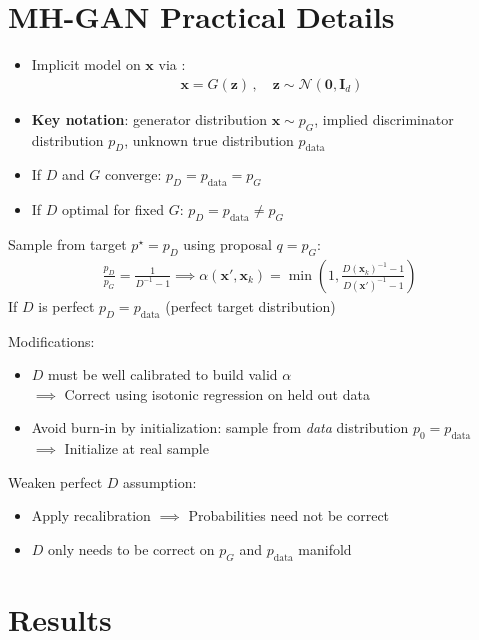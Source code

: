 \documentclass[a0,landscape]{a0poster}
\newcommand{\mysection}[1]{\section*{\fontsize{67.1}{82} \selectfont \color{NavyBlue} #1 \color{Black}}}
\renewcommand{\vec}[1]{{\boldsymbol{\mathbf{#1}}}} %
\newcommand{\R}{\mathbb{R}}
\newcommand{\set}[1]{\mathcal{#1}}
\newcommand{\sample}{\sim}
\newcommand{\norm}{\mathcal{N}}
\newcommand{\target}{{p^\star}}
\newcommand{\prop}{q}
\newcommand{\PG}{{p_G}}
\newcommand{\PD}{{p_D}}
\newcommand{\PR}{{p_{\textrm{data}}}}
\newcommand{\accept}{\alpha}
\newcommand{\setx}{\set{X}}
\begin{document}
\begin{multicols}{3}
\mysection{MH-GAN Practical Details}

\begin{itemize}
  \item Implicit model on $\vec x$ via \smash{$G \in \R^{d} \rightarrow \setx$}:
  \begin{align}
    \vec x = G(\vec z)\,, \quad \vec z \sample \norm(\vec 0, \vec I_{d})
  \end{align}
  \item \textbf{Key notation}: generator distribution $\vec x \sample \PG$, implied discriminator distribution $\PD$, unknown true distribution $\PR$
  \item If $D$ and $G$ converge: $\PD = \PR = \PG$
  \item If $D$ optimal for fixed $G$: $\PD = \PR \neq \PG$
\end{itemize}

Sample from target $\target=\PD$ using proposal $\prop=\PG$:
\begin{align}
  \frac{\PD}{\PG} = \frac{1}{D^{-1} - 1} \implies
  \accept(\vec x', \vec x_k) = \min\left(1, \frac{D(\vec x_k)^{-1} - 1}{D(\vec x')^{-1} - 1}\right)
\end{align}
If $D$ is perfect $\PD = \PR$ (perfect target distribution)

Modifications:
\begin{itemize}
  \item $D$ must be well calibrated to build valid $\accept$\\$\implies$ Correct using isotonic regression on held out data
  \item Avoid burn-in by initialization: \!sample from \emph{data} distribution $p_0 \!=\! \PR$\\$\implies$ Initialize at real sample
\end{itemize}

Weaken perfect $D$ assumption:
\begin{itemize}
  \item Apply recalibration $\implies$ Probabilities need not be correct
  \item $D$ only needs to be correct on $\PG$ and $\PR$ manifold
\end{itemize}

\columnbreak

\mysection{Results}


\end{multicols}
\end{document}
